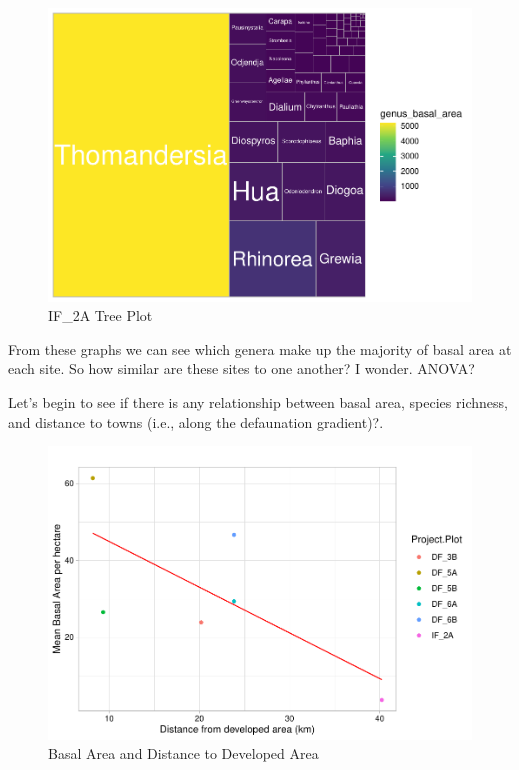 \documentclass[
  12pt,
]{article}
\begin{document}
\begin{figure}
\centering
\includegraphics{GoldenGriffithsKnierMalinowski_ENV872_Project_files/figure-latex/unnamed-chunk-11-1.pdf}
\caption{IF\_2A Tree Plot}
\end{figure}

From these graphs we can see which genera make up the majority of basal
area at each site. So how similar are these sites to one another? I
wonder. ANOVA?

Let's begin to see if there is any relationship between basal area,
species richness, and distance to towns (i.e., along the defaunation
gradient)?.

\begin{figure}
\centering
\includegraphics{GoldenGriffithsKnierMalinowski_ENV872_Project_files/figure-latex/unnamed-chunk-12-1.pdf}
\caption{Basal Area and Distance to Developed Area}
\end{figure}
\end{document}
